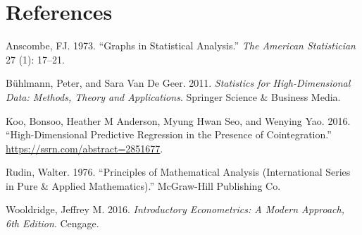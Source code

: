 \documentclass[12pt,]{article}
\begin{document}
\section*{References}\label{references}

\hypertarget{refs}{}
\hypertarget{ref-ANS73}{}
Anscombe, FJ. 1973. ``Graphs in Statistical Analysis.'' \emph{The
American Statistician} 27 (1): 17--21.

\hypertarget{ref-buhlmann}{}
Bühlmann, Peter, and Sara Van De Geer. 2011. \emph{Statistics for
High-Dimensional Data: Methods, Theory and Applications}. Springer
Science \& Business Media.

\hypertarget{ref-koo}{}
Koo, Bonsoo, Heather M Anderson, Myung Hwan Seo, and Wenying Yao. 2016.
``High-Dimensional Predictive Regression in the Presence of
Cointegration.'' \url{https://ssrn.com/abstract=2851677}.

\hypertarget{ref-rudin}{}
Rudin, Walter. 1976. ``Principles of Mathematical Analysis
(International Series in Pure \& Applied Mathematics).'' McGraw-Hill
Publishing Co.

\hypertarget{ref-wooldridge2016}{}
Wooldridge, Jeffrey M. 2016. \emph{Introductory Econometrics: A Modern
Approach, 6th Edition}. Cengage.
\end{document}
